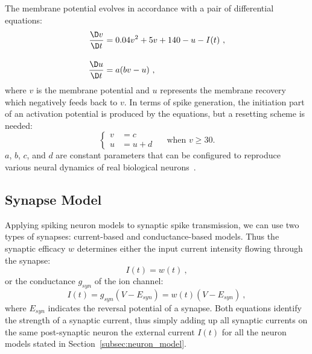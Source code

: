 The membrane potential evolves in accordance with a pair of differential equations:
\begin{equation}
\begin{aligned}
\dfrac{\D v}{\D t} &= 0.04v^2 + 5v + 140 - u - I(t)~,\\[10pt]
\dfrac{\D u}{\D t} &= a(bv - u)~,
\end{aligned}
\end{equation}
where $v$ is the membrane potential and $u$ represents the membrane recovery which negatively feeds back to $v$.
In terms of spike generation, the initiation part of an activation potential is produced by the equations, but a resetting scheme is needed:
\begin{equation}
\left\{
\begin{aligned}
v &= c \\
u &= u + d
\end{aligned}
\right.
\textrm{~~~~when~} v \geq 30.
\end{equation}  
$a$, $b$, $c$, and $d$ are constant parameters that can be configured to reproduce various neural dynamics of real biological neurons~\citep{izhikevich2004model}.

\subsection{Synapse Model}
Applying spiking neuron models to synaptic spike transmission, we can use two types of synapses: current-based and conductance-based models.
Thus the synaptic efficacy $w$ determines either the input current intensity flowing through the synapse: %
\begin{equation}
I(t) = w(t)~,
\end{equation}
or the \DIFdelbegin {}\DIFdelend \DIFaddbegin {}\DIFaddend conductance $g_{syn}$ of the ion channel: %
\begin{equation}
I(t) = g_{syn} (V-E_{syn}) = w(t) (V-E_{syn})~,
\end{equation}
where $E_{syn}$ indicates the reversal potential of a synapse.
Both equations identify the strength of a synaptic current, thus simply adding up all synaptic currents on the same post-synaptic neuron \DIFdelbegin {}\DIFdelend \DIFaddbegin {}\DIFaddend the external current $I(t)$ for all the neuron models stated in Section~\ref{subsec:neuron_model}.


